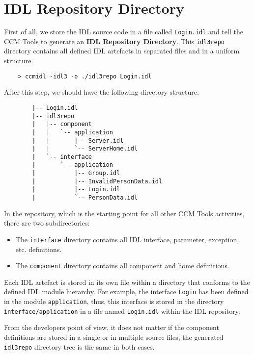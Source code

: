 \section{IDL Repository Directory}
\label{section:IdlRepositoryDirectory}

First of all, we store the IDL source code in a file called {\tt Login.idl}
and tell the CCM Tools to generate an {\bf IDL Repository Directory}.
This {\tt idl3repo} directory contains all defined IDL artefacts in separated
files and in a uniform structure.

\begin{verbatim}
	> ccmidl -idl3 -o ./idl3repo Login.idl
\end{verbatim}

After this step, we should have the following directory structure:
\begin{verbatim}
        |-- Login.idl
        |-- idl3repo
        |   |-- component
        |   |   `-- application
        |   |       |-- Server.idl
        |   |       `-- ServerHome.idl
        |   `-- interface
        |       `-- application
        |           |-- Group.idl
        |           |-- InvalidPersonData.idl
        |           |-- Login.idl
        |           `-- PersonData.idl
\end{verbatim}

In the repository, which is the starting point for all other CCM Tools activities,
there are two subdirectories:
\begin{itemize}
 	\item The {\tt interface} directory contains all IDL interface,
 	parameter, exception, etc. definitions.
 	  
  	\item The {\tt component} directory contains all component and
  	home definitions.
\end{itemize}

Each IDL artefact is stored in its own file within a directory that
conforms to the defined IDL module hierarchy.
For example, the interface {\tt Login} has been defined in the module 
{\tt application}, thus, this interface is stored in the directory 
{\tt interface/application} in a file named {\tt Login.idl} within the IDL 
repository.

\vspace{3mm}
From the developers point of view, it does not matter if the component
definitions are stored in a single or in multiple source files, the generated 
{\tt idl3repo} directory tree is the same in both cases.

 \newpage
